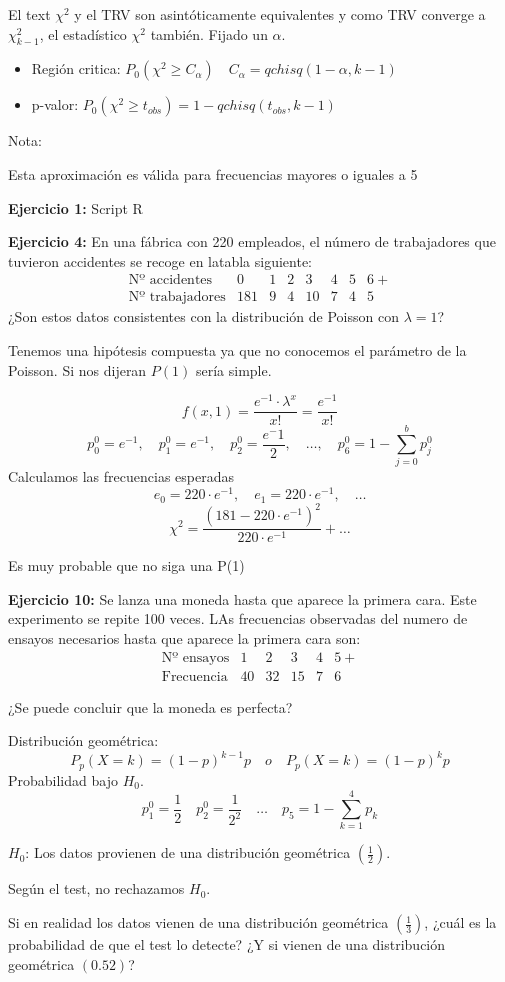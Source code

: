 
El text $\chi^2$ y el TRV son asintóticamente equivalentes y como TRV converge a $\chi^2_{k-1}$, el estadístico $\chi^2$ también.
Fijado un $\alpha$.
\begin{itemize}
    \item Región critica: $P_0(\chi^2 \geq C_\alpha) \quad C_\alpha=qchisq(1-\alpha,k-1)$
    \item p-valor: $P_0(\chi^2 \geq t_{obs})=1-qchisq(t_{obs},k-1)$
\end{itemize}

Nota:

Esta aproximación es válida para frecuencias mayores o iguales a 5

\textbf{Ejercicio 1:} Script R

\textbf{Ejercicio 4:} En una fábrica con 220 empleados, el número de trabajadores que tuvieron accidentes se recoge en latabla siguiente:
\[
\begin{matrix}
    \text{Nº accidentes} & 0& 1& 2& 3&  4& 5& 6+\\
    \text{Nº trabajadores}&  181& 9& 4&10&7&4&5
\end{matrix}
\]
¿Son estos datos consistentes con la distribución de Poisson con $\lambda=1$?

Tenemos una hipótesis compuesta ya que no conocemos el parámetro de la Poisson.
Si nos dijeran $P(1)$ sería simple.

\[
f(x,1)=\frac{e^{-1}\cdot \lambda^x}{x!}=\frac{e^{-1}}{x!}
\]
\[
p_0^0=e^{-1} ,\quad p_1^0=e^{-1} ,\quad p_2^0=\frac{e^-1}{2} ,\quad \dots,\quad p_6^0=1-\sum_{j=0}^{b}p_j^0
\]
Calculamos las frecuencias esperadas
\[
e_0=220 \cdot e^{-1},\quad e_1=220 \cdot e^{-1}, \quad \dots
\]
\[
\chi^2=\frac{(181-220 \cdot e^{-1})^2}{220 \cdot e^{-1}}+\dots
\]

Es muy probable que no siga una P(1)

\textbf{Ejercicio 10:} Se lanza una moneda hasta que aparece la primera cara. Este experimento se repite 100 veces. LAs frecuencias observadas del numero de ensayos necesarios hasta que aparece la primera cara son:
\[
\begin{matrix}
    \text{Nº ensayos} & 1& 2& 3& 4&5+\\
    \text{Frecuencia} &40&32&15&7& 6
\end{matrix}
\]

¿Se puede concluir que la moneda es perfecta?

Distribución geométrica:
\[
P_p(X=k)=(1-p)^{k-1}p \quad o \quad P_p(X=k)=(1-p)^{k}p
\]
Probabilidad bajo $H_0$.
\[
p_1^0=\frac{1}{2} \quad p_2^0=\frac{1}{2^2} \quad \dots \quad p_5=1-\sum_{k=1}^{4} p_k
\]

\(H_0\): Los datos provienen de una distribución geométrica \(\left(\frac{1}{2}\right)\).

Según el test, no rechazamos \(H_0\).

Si en realidad los datos vienen de una distribución geométrica \(\left(\frac{1}{3}\right)\),  
¿cuál es la probabilidad de que el test lo detecte?  
¿Y si vienen de una distribución geométrica \((0.52)\)?


 